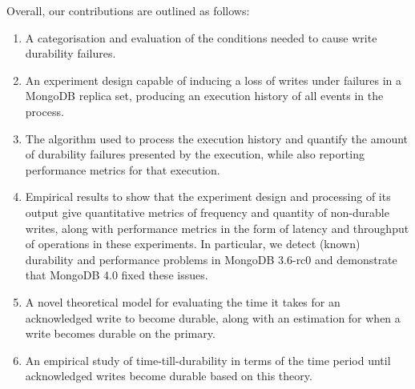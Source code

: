 Overall, our contributions are outlined as follows:
\begin{enumerate}
    \item A categorisation and evaluation of the conditions needed to cause write durability failures.
    \item An experiment design capable of inducing a loss of writes under failures in a MongoDB replica set, producing an execution history of all events in the process.
    \item The algorithm used to process the execution history and quantify the amount of durability failures presented by the execution, while also reporting performance metrics for that execution.
    \item Empirical results to show that the experiment design and processing of its output give quantitative metrics of frequency and quantity of non-durable writes, along with performance metrics in the form of latency and throughput of operations in these experiments. In particular, we detect (known) durability and performance problems in MongoDB 3.6-rc0 and demonstrate that MongoDB 4.0 fixed these issues.
    \item A novel theoretical model for evaluating the time it takes for an acknowledged write to become durable, along with an estimation for when a write becomes durable on the primary.
    \item An empirical study of time-till-durability in terms of the time period until acknowledged writes become durable based on this theory.
    

\end{enumerate}
